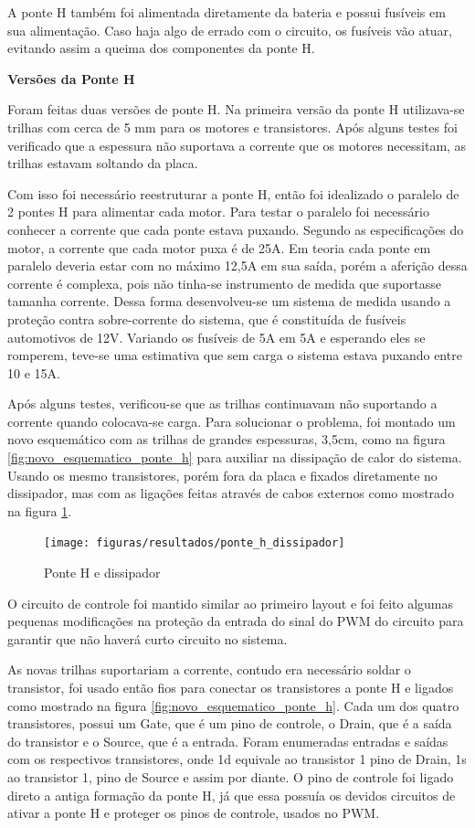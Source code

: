 A ponte H também foi alimentada diretamente da bateria e possui fusíveis em sua alimentação. Caso haja algo de errado com o circuito, os fusíveis vão atuar, evitando assim a queima dos componentes da ponte H.

\textbf{Versões da Ponte H}

Foram feitas duas versões de ponte H. Na primeira versão da ponte H utilizava-se trilhas com cerca de 5 mm para os motores e transistores. Após alguns testes foi verificado que a espessura não suportava a corrente que os motores necessitam, as trilhas estavam soltando da placa.

Com isso foi necessário reestruturar a ponte H, então foi idealizado o paralelo de 2 pontes H para alimentar cada motor. Para testar o paralelo foi necessário conhecer a corrente que cada ponte estava puxando. Segundo as especificações do motor, a corrente que cada motor puxa é de 25A. Em teoria cada ponte em paralelo deveria estar com no máximo 12,5A em sua saída, porém a aferição dessa corrente é complexa, pois não tinha-se instrumento de medida que suportasse tamanha corrente. Dessa forma desenvolveu-se um sistema de medida usando a proteção contra sobre-corrente do sistema, que é constituída de fusíveis automotivos de 12V. Variando os fusíveis de 5A em 5A e esperando eles se romperem, teve-se uma estimativa que sem carga o sistema estava puxando entre 10 e 15A.

Após alguns testes, verificou-se que as trilhas continuavam não suportando a corrente quando colocava-se carga. Para solucionar o problema, foi montado um novo esquemático com as trilhas de grandes espessuras, 3,5cm, como na figura \ref{fig:novo_esquematico_ponte_h} para auxiliar na dissipação de calor do sistema. Usando os mesmo transistores, porém fora da placa e fixados diretamente no dissipador, mas com as ligações feitas através de cabos externos como mostrado na figura \ref{fig:ponte_h_dissipador}.

\begin{figure}[!ht]
  \center
  \texttt{[image: figuras/resultados/ponte\_h\_dissipador]}
  \caption{Ponte H e dissipador}
  \label{fig:ponte_h_dissipador}
\end{figure}


O circuito de controle foi mantido similar ao primeiro layout e foi feito algumas pequenas modificações na proteção da entrada do sinal do PWM do circuito para garantir que não haverá curto circuito no sistema.

As novas trilhas suportariam a corrente, contudo era necessário soldar o transistor, foi usado então fios para conectar os transistores a ponte H e ligados como mostrado na figura \ref{fig:novo_esquematico_ponte_h}. Cada um dos quatro transistores, possui um Gate, que é um pino de controle, o Drain, que é a saída do transistor e o Source, que é a entrada. Foram enumeradas entradas e saídas com os respectivos transistores, onde 1d equivale ao transistor 1 pino de Drain, 1s ao transistor 1, pino de Source e assim por diante. O pino de controle foi ligado direto a antiga formação da ponte H, já que essa possuía os devidos circuitos de ativar a ponte H e proteger os pinos de controle, usados no PWM.

